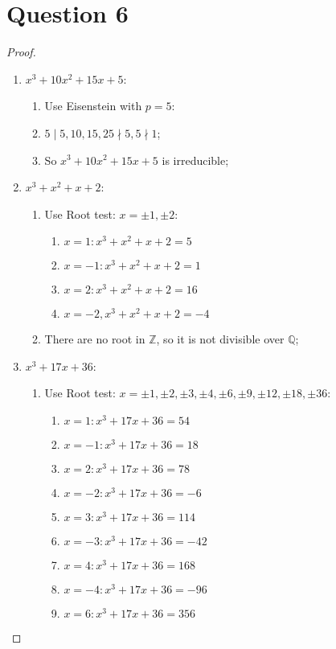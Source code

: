 \documentclass{article}
\begin{document}
\section*{Question 6}

\begin{proof}
    ~\begin{enumerate}
    \item $x^3+10x^2+15x+5$:
    \begin{enumerate}
        \item Use Eisenstein with $p=5$:
        \item $5\mid 5,10,15, 25\nmid 5,5\nmid 1$;
        \item So $x^3+10x^2+15x+5$ is irreducible;
    \end{enumerate}
    \item $x^3+x^2+x+2$:
    \begin{enumerate}
        \item Use Root test: $x=\pm 1,\pm2$:
        \begin{enumerate}
            \item $x=1:x^3+x^2+x+2=5$
            \item $x=-1: x^3+x^2+x+2=1$
            \item $x=2: x^3+x^2+x+2=16$
            \item $x=-2,x^3+x^2+x+2=-4$
        \end{enumerate}
        \item There are no root in $\mathbb{Z}$, so it is not divisible over $\mathbb{Q}$;
    \end{enumerate}
    \item $x^3+17x+36$:
    \begin{enumerate}
        \item Use Root test: $x=\pm1,\pm2,\pm3,\pm4,\pm6,\pm9,\pm12,\pm18,\pm36$:\
        \begin{enumerate}
            \item $x=1:x^3+17x+36=54$
            \item $x=-1:x^3+17x+36=18$
            \item $x=2:x^3+17x+36=78$
            \item $x=-2:x^3+17x+36=-6$
            \item $x=3:x^3+17x+36=114$
            \item $x=-3:x^3+17x+36=-42$
            \item $x=4:x^3+17x+36=168$
            \item $x=-4:x^3+17x+36=-96$
            \item $x=6:x^3+17x+36=356$

\end{enumerate}
\end{enumerate}
\end{enumerate}
\end{proof}
\end{document}
